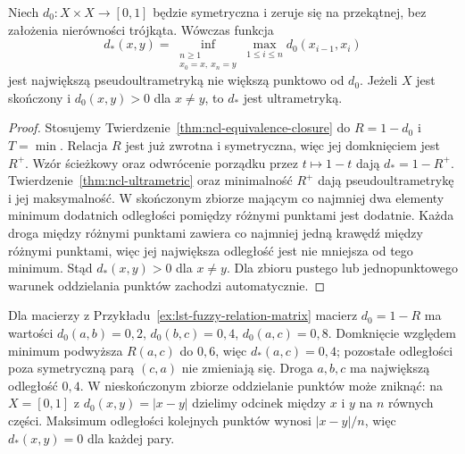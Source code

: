 \begin{wniosek}
\label{cor:ncl-subdominant-ultrametric}
Niech $d_0:X\times X\to[0,1]$ będzie symetryczna
i zeruje się na przekątnej, bez założenia nierówności
trójkąta. Wówczas funkcja
\[
 d_*(x,y)=\inf_{\substack{n\geq1\\x_0=x,\ x_n=y}}
 \max_{1\leq i\leq n}d_0(x_{i-1},x_i)
\]
jest największą pseudoultrametryką nie większą
punktowo od $d_0$. Jeżeli $X$ jest skończony
i $d_0(x,y)>0$ dla $x\ne y$, to $d_*$ jest
ultrametryką.
\end{wniosek}
\begin{proof}
Stosujemy Twierdzenie~\ref{thm:ncl-equivalence-closure}
do $R=1-d_0$ i $T=\min$. Relacja $R$ jest już
zwrotna i symetryczna, więc jej domknięciem jest $R^+$.
Wzór ścieżkowy oraz odwrócenie porządku przez
$t\mapsto1-t$ dają $d_*=1-R^+$.
Twierdzenie~\ref{thm:ncl-ultrametric} oraz minimalność
$R^+$ dają pseudoultrametrykę i jej maksymalność.
W skończonym zbiorze mającym co najmniej dwa elementy
minimum dodatnich odległości pomiędzy różnymi
punktami jest dodatnie. Każda droga między różnymi
punktami zawiera co najmniej jedną krawędź między
różnymi punktami, więc jej największa odległość
jest nie mniejsza od tego minimum. Stąd $d_*(x,y)>0$
dla $x\ne y$. Dla zbioru pustego lub jednopunktowego
warunek oddzielania punktów zachodzi automatycznie.
\end{proof}

\begin{przyklad}\label{ex:ncl-subdominant-ultrametric}
Dla macierzy z Przykładu~\ref{ex:lst-fuzzy-relation-matrix}
macierz $d_0=1-R$ ma wartości
$d_0(a,b)=0{,}2$, $d_0(b,c)=0{,}4$, $d_0(a,c)=0{,}8$.
Domknięcie względem minimum podwyższa $R(a,c)$
do $0{,}6$, więc $d_*(a,c)=0{,}4$; pozostałe
odległości poza symetryczną parą $(c,a)$ nie zmieniają
się. Droga $a,b,c$ ma największą odległość $0{,}4$.
W nieskończonym zbiorze oddzielanie punktów może zniknąć:
na $X=[0,1]$ z $d_0(x,y)=|x-y|$ dzielimy odcinek
między $x$ i $y$ na $n$ równych części. Maksimum
odległości kolejnych punktów wynosi $|x-y|/n$,
więc $d_*(x,y)=0$ dla każdej pary.
\end{przyklad}

